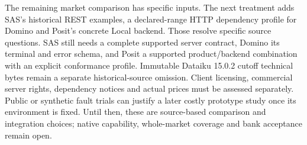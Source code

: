 The remaining market comparison has specific inputs. The next treatment adds SAS's historical REST examples, a declared-range HTTP dependency profile for Domino and Posit's concrete Local backend. Those resolve specific source questions. SAS still needs a complete supported server contract, Domino its terminal and error schema, and Posit a supported product/backend combination with an explicit conformance profile. Immutable Dataiku 15.0.2 cutoff technical bytes remain a
separate historical-source omission. Client licensing, commercial server
rights, dependency notices and actual prices must be assessed separately.
Public or synthetic fault trials can justify a later costly prototype study
once its environment is fixed. Until then, these are source-based comparison
and integration choices; native capability, whole-market coverage and bank
acceptance remain open.
